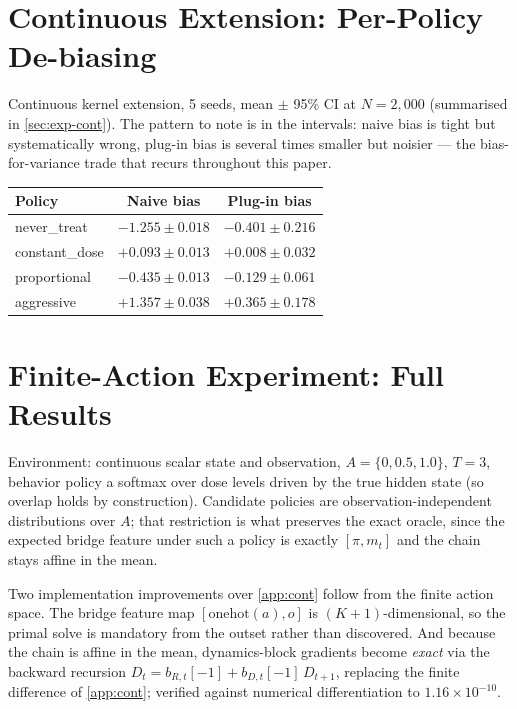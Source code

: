 \section{Continuous Extension: Per-Policy De-biasing}
\label{app:cont-tab}

Continuous kernel extension, 5 seeds, mean $\pm$ 95\% CI at $N{=}2{,}000$
(summarised in \cref{sec:exp-cont}). The pattern to note is in the intervals:
naive bias is tight but systematically wrong, plug-in bias is several times
smaller but noisier --- the bias-for-variance trade that recurs throughout this
paper.

\begin{center}\small
\begin{tabular}{@{}lcc@{}}
\toprule
Policy & Naive bias & Plug-in bias \\
\midrule
never\_treat & $-1.255 \pm 0.018$ & $\mathbf{-0.401 \pm 0.216}$ \\
constant\_dose & $+0.093 \pm 0.013$ & $\mathbf{+0.008 \pm 0.032}$ \\
proportional & $-0.435 \pm 0.013$ & $\mathbf{-0.129 \pm 0.061}$ \\
aggressive & $+1.357 \pm 0.038$ & $\mathbf{+0.365 \pm 0.178}$ \\
\bottomrule
\end{tabular}
\end{center}

\section{Finite-Action Experiment: Full Results}
\label{app:fa}

Environment: continuous scalar state and observation, $A = \{0, 0.5, 1.0\}$,
$T{=}3$, behavior policy a softmax over dose levels driven by the true hidden
state (so overlap holds by construction). Candidate policies are
observation-independent distributions over $A$; that restriction is what
preserves the exact oracle, since the expected bridge feature under such a policy
is exactly $[\pi, m_t]$ and the chain stays affine in the mean.

Two implementation improvements over \cref{app:cont} follow from the finite
action space. The bridge feature map $[\mathrm{onehot}(a), o]$ is
$(K{+}1)$-dimensional, so the primal solve is mandatory from the outset rather
than discovered. And because the chain is affine in the mean, dynamics-block
gradients become \emph{exact} via the backward recursion
$D_t = b_{R,t}[-1] + b_{D,t}[-1]\, D_{t+1}$, replacing the finite difference of
\cref{app:cont}; verified against numerical differentiation to
$1.16\times10^{-10}$.

